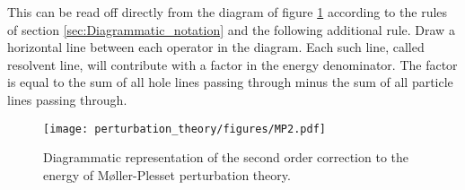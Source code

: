 This can be read off directly from the diagram of figure \ref{fig:MP2} according to the rules of section \ref{sec:Diagrammatic_notation} and
the following additional rule. Draw a horizontal line between each operator in the diagram.
Each such line, called resolvent line, will contribute with a factor in the energy denominator. The factor is equal to the sum of all hole lines passing through minus the sum
of all particle lines passing through.
\begin{figure}
 \begin{center}
  \texttt{[image: perturbation\_theory/figures/MP2.pdf]}
  \caption{Diagrammatic representation of the second order correction to the energy of Møller-Plesset perturbation theory.}
  \label{fig:MP2}
 \end{center}
\end{figure}


